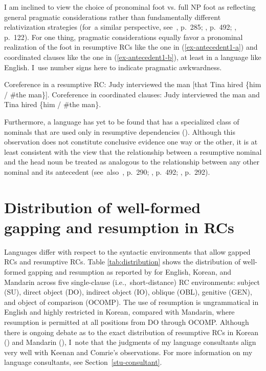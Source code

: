 I am inclined to view the choice of pronominal foot vs. full NP foot as reflecting general pragmatic considerations rather than fundamentally different relativization strategies (for~a similar perspective, see~\cite{asudeh2012}, p.~285; \cite{prince1990}, p.~492; \cite{radford2019}, p.~122). For one thing, pragmatic considerations equally favor a pronominal realization of the foot in resumptive RCs like the one in (\ref{ex-antecedent1-a}) and coordinated clauses like the one in (\ref{ex-antecedent1-b}), at least in a language like English. I~use number signs here to indicate pragmatic awkwardness.

\pex\label{ex-antecedent1}
\a Coreference in a resumptive RC: \vspace{5pt}\newline
\ljudge*Judy interviewed the man [that Tina hired \{him / \#the man\}].\label{ex-antecedent1-a}
\a Coreference in coordinated clauses: \vspace{5pt}\newline
Judy interviewed the man and Tina hired \{him / \#the man\}.\label{ex-antecedent1-b}
\xe

\noindent Furthermore, a language has yet to be found that has a specialized class of nominals that are used only in resumptive dependencies (\cite{francis2021,mccloskey2002,mccloskey2017,meltzer-asscher2021}). Although this observation does not constitute conclusive evidence one way or the other, it is at least consistent with the view that the relationship between a resumptive nominal and the head noun be treated as analogous to the relationship between any other nominal and its antecedent (see~also~\cite{doron2011}, p.~290; \cite{prince1990}, p.~492; \cite{sells1987}, p.~292).

\section{Distribution of well-formed gapping and resumption in RCs}\label{pro-distribution}

Languages differ with respect to the syntactic environments that allow gapped RCs and resumptive RCs. Table \ref{tab:distribution} shows the distribution of well-formed gapping and resumption as reported by \textcite{keenan.comrie1977} for English, Korean, and Mandarin across five single-clause (i.e.,~short-distance) RC environments: subject (SU), direct object (DO), indirect object (IO), oblique (OBL), genitive (GEN), and object of comparison (OCOMP). The use of resumption is ungrammatical in English and highly restricted in Korean, compared with Mandarin, where resumption is permitted at all positions from DO through OCOMP. Although there is ongoing debate as to the exact distribution of resumptive RCs in Korean (\cite{han2013,kwon2008,song2003}) and Mandarin (\cite{hitz.francis2016,pan2016}), I~note that the judgments of my language consultants align very well with Keenan and Comrie's observations. For more information on my language consultants, see Section~\ref{stu-consultant}.

